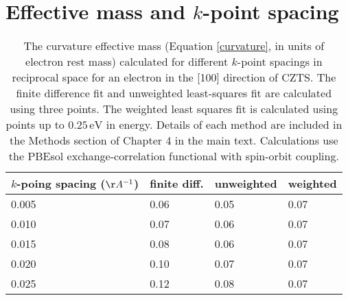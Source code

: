 \chapter{\label{app:2-sampling}Effective mass and $k$-point spacing}

\begin{table}[h!] \centering 
\caption[Effective mass and $k$-point spacing]{The curvature effective mass (Equation \ref{curvature}, in units of electron rest mass) calculated for different $k$-point spacings in reciprocal space for an electron in the [100] direction of CZTS. The finite difference fit and unweighted least-squares fit are calculated using three points. The weighted least squares fit is calculated using points up to $0.25\,\mathrm{eV}$ in energy. Details of each method are included in the Methods section of Chapter 4 in the main text. Calculations use the PBEsol exchange-correlation functional with spin-orbit coupling.}
\begin{tabular}{@{}llll@{}}\toprule
$k$-poing spacing ($\AA^{-1}$) & finite diff. & unweighted  & weighted \\ 
\midrule
 0.005 & 0.06 & 0.05 & 0.07 \\
 0.010 & 0.07 & 0.06 & 0.07 \\
 0.015 & 0.08 & 0.06 & 0.07 \\
 0.020 & 0.10 & 0.07 & 0.07 \\
 0.025 & 0.12 & 0.08 & 0.07 \\
\bottomrule
\end{tabular}
\end{table}

